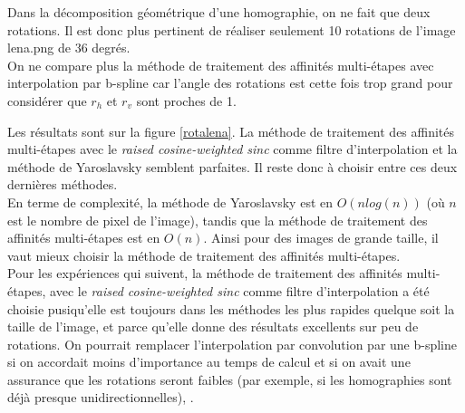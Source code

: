 	Dans la décomposition géométrique d'une homographie, on ne fait que deux rotations. Il est donc plus pertinent de réaliser seulement 10 rotations de l'image lena.png de 36 degrés.\\

	On ne compare plus la méthode de traitement des affinités multi-étapes avec interpolation par b-spline car l'angle des rotations est cette fois trop grand pour considérer que $r_h$ et $r_v$ sont proches de 1.
	
	Les résultats sont sur la figure \ref{rotalena}. La méthode de traitement des affinités multi-étapes avec le \emph{raised cosine-weighted sinc} comme filtre d'interpolation et la méthode de Yaroslavsky semblent parfaites. Il reste donc à choisir entre ces deux dernières méthodes.\\

En terme de complexité, la méthode de Yaroslavsky est en $O(n log(n))$ (où $n$ est le nombre de pixel de l'image), tandis que la méthode de traitement des affinités multi-étapes est en $O(n)$. Ainsi pour des images de grande taille, il vaut mieux choisir la méthode de traitement des affinités multi-étapes.\\

Pour les expériences qui suivent, la méthode de traitement des affinités multi-étapes, avec le \emph{raised cosine-weighted sinc} comme filtre d'interpolation a été choisie pusiqu'elle est toujours dans les méthodes les plus rapides quelque soit la taille de l'image, et parce qu'elle donne des résultats excellents sur peu de rotations. 
On pourrait remplacer l'interpolation par convolution par une b-spline si on accordait moins d'importance au temps de calcul et si on avait une assurance que les rotations seront faibles (par exemple, si les homographies sont déjà presque unidirectionnelles), .

